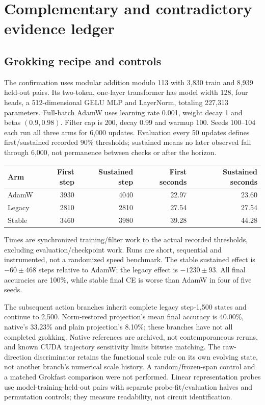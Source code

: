 \documentclass[10pt]{article}
\begin{document}
\section{Complementary and contradictory evidence ledger}\label{app:ledger}
\subsection{Grokking recipe and controls}
The confirmation uses modular addition modulo 113 with 3,830 train and 8,939 held-out pairs. Its two-token, one-layer transformer has model width 128, four heads, a 512-dimensional GELU MLP and LayerNorm, totaling 227,313 parameters. Full-batch AdamW uses learning rate 0.001, weight decay 1 and betas $(0.9,0.98)$. Filter cap is 200, decay 0.99 and warmup 100. Seeds 100--104 each run all three arms for 6,000 updates. Evaluation every 50 updates defines first/sustained recorded 90\% thresholds; sustained means no later observed fall through 6,000, not permanence between checks or after the horizon.

\begin{center}\small
\begin{tabular}{lrrrr}\toprule
Arm & First step & Sustained step & First seconds & Sustained seconds\\\midrule
AdamW & 3930 & 4040 & 22.97 & 23.60\\
Legacy & 2810 & 2810 & 27.54 & 27.54\\
Stable & 3460 & 3980 & 39.28 & 44.28\\\bottomrule
\end{tabular}
\end{center}
Times are synchronized training/filter work to the actual recorded thresholds, excluding evaluation/checkpoint work. Runs are short, sequential and instrumented, not a randomized speed benchmark. The stable sustained effect is $-60\pm468$ steps relative to AdamW; the legacy effect is $-1230\pm93$. All final accuracies are 100\%, while stable final CE is worse than AdamW in four of five seeds.

The subsequent action branches inherit complete legacy step-1,500 states and continue to 2,500. Norm-restored projection's mean final accuracy is 40.00\%, native's 33.23\% and plain projection's 8.10\%; these branches have not all completed grokking. Native references are archived, not contemporaneous reruns, and known CUDA trajectory sensitivity limits bitwise matching. The raw-direction discriminator retains the functional scale rule on its own evolving state, not another branch's numerical scale history. A random/frozen-span control and a matched Grokfast comparison were not performed. Linear representation probes use model-training-held-out pairs with separate probe-fit/evaluation halves and permutation controls; they measure readability, not circuit identification.
\end{document}
